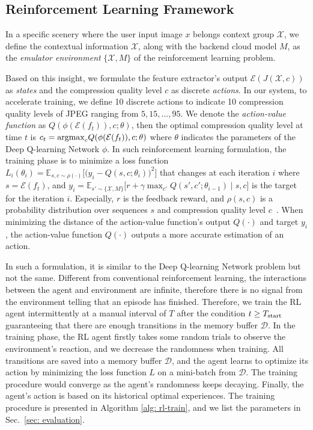 \subsection{Reinforcement Learning Framework}

In a specific scenery where the user input image $ x $ belongs context group $ \mathcal{X} $, we define the contextual information $ \mathcal{X} $, along with the backend cloud model $ M $, as the \emph{emulator environment} $ \{\mathcal{X}, M\} $ of the reinforcement learning problem. 

Based on this insight, we formulate the feature extractor's output $ \mathcal{E}(J(\mathcal{X}, c)) $ as \emph{states} and the compression quality level $ c $ as discrete \emph{actions}. In our system, to accelerate training, we define 10 discrete actions to indicate 10 compression quality levels of JPEG ranging from $ 5, 15, ...,95 $. We denote the \emph{action-value function} as $ Q(\phi(\mathcal{E}(f_t)), c; \theta) $, then the optimal compression quality level at time $ t $ is $ c_t = {\rm argmax}_cQ(\phi(\mathcal{E}(f_t)), c; \theta) $ where $ \theta $ indicates the parameters of the Deep Q-learning Network $ \phi $. In such reinforcement learning formulation, the training phase is to minimize a loss function $ L_i(\theta_i) = \mathbb{E}_{s, c \sim \rho (\cdot)}\Big[\big(y_i - Q(s, c; \theta_i)\big)^2 \Big] $ that changes at each iteration $ i $ where $ s = \mathcal{E}(f_t) $, and $ y_i = \mathbb{E}_{s' \sim \{\mathcal{X}, M\}} \big[ r + \gamma \max_{c'} Q(s', c'; \theta_{i-1}) \mid s, c \big] $ is the target for the iteration $ i $. Especially, $ r $ is the feedback reward, and $ \rho(s, c) $ is a probability distribution over sequences $ s $ and compression quality level $ c $~\cite{DQN}. When minimizing the distance of the action-value function's output $ Q(\cdot) $ and target $ y_i $, the action-value function $ Q(\cdot) $ outputs a more accurate estimation of an action. 

In such a formulation, it is similar to the Deep Q-learning Network problem but not the same. Different from conventional reinforcement learning, the interactions between the agent and environment are infinite, therefore there is no signal from the environment telling that an episode has finished. Therefore, we train the RL agent intermittently at a manual interval of $ T $ after the condition $ t \geq T_{\rm start} $ guaranteeing that there are enough transitions in the memory buffer $ \mathcal{D} $. In the training phase, the RL agent firstly takes some random trials to observe the environment's reaction, and we decrease the randomness when training. All transitions are saved into a memory buffer $ \mathcal{D} $, and the agent learns to optimize its action by minimizing the loss function $ L $ on a mini-batch from $ \mathcal{D} $. The training procedure would converge as the agent's randomness keeps decaying. Finally, the agent's action is based on its historical optimal experiences. The training procedure is presented in Algorithm \ref{alg: rl-train}, and we list the parameters in Sec.~\ref{sec: evaluation}.

